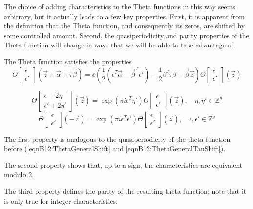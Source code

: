 The choice of adding characteristics to the Theta functions in this way seems arbitrary, but it actually leads to a few key properties. First, it is apparent from the definition that the Theta function, and consequently its zeros, are shifted by some controlled amount. Second, the quasiperiodicity and parity properties of the Theta function will change in ways that we will be able to take advantage of.

\begin{lemma}
    The Theta function satisfies the properties
    \begin{equation}\Theta\begin{bmatrix}\epsilon \\ \epsilon'\end{bmatrix}(\vec z + \vec \alpha + \tau \vec \beta) =
    \ee\left(\frac{1}{2}(\epsilon^T \vec \alpha - \vec \beta^T \epsilon') - \frac{1}{2} \beta^T \tau \beta - \vec \beta \vec z\right)
    \Theta\begin{bmatrix}\epsilon \\ \epsilon'\end{bmatrix}(\vec z)
    \end{equation}

    \begin{equation}\Theta\begin{bmatrix}\epsilon + 2\eta \\ \epsilon' + 2\eta' \end{bmatrix}(\vec z) = \exp(\pi i \epsilon^T \eta')
    \Theta\begin{bmatrix}\epsilon \\ \epsilon'\end{bmatrix}(\vec z) , \quad \eta,\eta' \in \mathbb Z^g\end{equation}
    \begin{equation}\Theta\begin{bmatrix}\epsilon \\ \epsilon'\end{bmatrix}(-\vec z) = \exp(\pi i \epsilon^T \epsilon') \Theta\begin{bmatrix}\epsilon \\ \epsilon'\end{bmatrix}(\vec z) , \quad \epsilon,\epsilon' \in \mathbb Z^g\end{equation}

    The first property is analogous to the quasiperiodicity of the theta function before (\ref{eqnB12:ThetaGeneralShift} and \ref{eqnB12:ThetaGeneralTauShift}).
    
    The second property shows that, up to a sign, the characteristics are equivalent modulo 2.
    
    The third property defines the parity of the resulting theta function; note that it is only true for integer characteristics.
\end{lemma}

